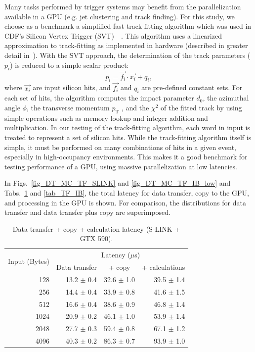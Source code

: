 \documentclass[journal]{IEEEtran}
\begin{document}
Many tasks performed by trigger systems may benefit from the 
parallelization available in a GPU (e.g. jet clustering and track finding). 
For this study, we choose as a benchmark a simplified fast track-fitting
algorithm which was used in CDF's Silicon Vertex Trigger 
(SVT)~\cite{bib_SVT1}~\cite{bib_SVT2}.
This algorithm uses a linearized approximation to track-fitting as 
implemented in hardware (described in greater detail in~\cite{bib_SVT3}). 
With the SVT approach, the determination of the track parameters 
($p_i$) is reduced to a simple scalar product:
\[
p_i = \vec{f_i} \cdot \vec{x_i} + q_i,
\]
where $\vec{x_i}$ are input silicon hits, and $\vec{f_i}$ and $q_i$ are 
pre-defined constant sets. For each set of hits, the algorithm
computes the impact parameter $d_0$, the azimuthal angle $\phi$, 
the transverse momentum $p_\mathrm{T}$ , and the $\chi^2$ of the
fitted track by using simple operations such as memory lookup and 
integer addition and multiplication. In
our testing of the track-fitting algorithm, each word in input is treated to
represent a set of silicon hits. While the track-fitting algorithm 
itself is simple, it must be performed on
many combinations of hits in a given event, especially in high-occupancy 
environments. This makes it a good 
benchmark for testing performance of a GPU, using massive parallelization at low latencies.

In Figs.~\ref{fig_DT_MC_TF_SLINK} and \ref{fig_DT_MC_TF_IB_low}
and Tabs.~\ref{tab_TF_SLINK} and \ref{tab_TF_IB},
the total latency for data transfer, 
copy to the GPU, and processing in the GPU is shown. For comparison, 
 the distributions for data transfer and data transfer plus copy are 
superimposed. 

\begin{table}[!t]
  \centering
  \begin{tabular}{|r||r|r|r|}
    \hline

    \multirow{2}{*}{Input (Bytes)} & \multicolumn{3}{|c|}{ Latency  ($\mu$s)}  \\     
    
                                   & \multicolumn{1}{|c|}{Data transfer}
                                   & \multicolumn{1}{|c|}{+ copy}
                                   & \multicolumn{1}{|c|}{+ calculations} \\

    \hline
    \hline
    128 & 13.2 $\pm$ 0.4 & 32.6 $\pm$ 1.0 & 39.5 $\pm$ 1.4 \\ 
    256 & 14.4 $\pm$ 0.4 & 33.9 $\pm$ 0.8 & 41.6 $\pm$ 1.5 \\ 
    512 & 16.6 $\pm$ 0.4 & 38.6 $\pm$ 0.9 & 46.8 $\pm$ 1.4 \\ 
    1024 & 20.9 $\pm$ 0.2 & 46.1 $\pm$ 1.0 & 53.9 $\pm$ 1.4 \\ 
    2048 & 27.7 $\pm$ 0.3 & 59.4 $\pm$ 0.8 & 67.1 $\pm$ 1.2 \\ 
    4096 & 40.3 $\pm$ 0.2 & 86.3 $\pm$ 0.7 & 93.9 $\pm$ 1.0 \\      
    \hline
  \end{tabular}
\caption{Data transfer + copy + calculation latency (S-LINK + GTX 590).}
\label{tab_TF_SLINK}
\end{table}
\end{document}
